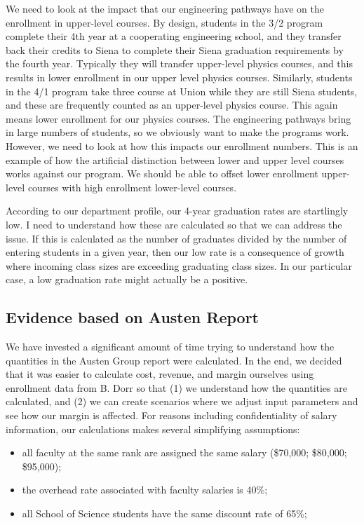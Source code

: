 \documentclass[12pt]{article}
\begin{document}
We need to look at the impact that our engineering pathways have on the enrollment in upper-level courses.  By design, students in the 3/2 program complete their 4th year at a cooperating engineering school, and they transfer back their credits to Siena to complete their Siena graduation requirements by the fourth year.  Typically they will transfer upper-level physics courses, and this results in lower enrollment in our upper level physics courses.  Similarly, students in the 4/1 program take three course at Union while they are still Siena students, and these are frequently counted as an upper-level physics course.  This again means lower enrollment for our physics courses.  The engineering pathways bring in large numbers of students, so we obviously want to make the programs work.  However, we need to look at how this impacts our enrollment numbers.  This is an example of how the artificial distinction between lower and upper level courses works against our program.  We should be able to offset lower enrollment upper-level courses with high enrollment lower-level courses.

According to our department profile, our 4-year graduation rates are startlingly low.  I need to understand how these are calculated so that we can address the issue.  If this is calculated as the number of graduates divided by the number of entering students in a given year, then our low rate is a consequence of growth where incoming class sizes are exceeding graduating class sizes. In our particular case, a low graduation rate might actually be a positive.

\subsection{Evidence based on Austen Report}
We have invested a significant amount of time trying to understand how the quantities in the Austen Group report were calculated.  In the end, we decided that it was easier to calculate cost, revenue, and margin ourselves using enrollment data from B. Dorr so that (1) we understand how the quantities are calculated, and (2) we can create scenarios where we adjust input parameters and see how  our margin is affected.   For reasons including confidentiality of salary information, our calculations makes several simplifying assumptions:
\begin{itemize}
\item all faculty at the same rank are assigned the same salary (\$70,000; \$80,000; \$95,000);
\item the overhead rate associated with faculty salaries is 40\%;
\item all School of Science students have the same discount rate of 65\%;
\end{itemize}
\end{document}
